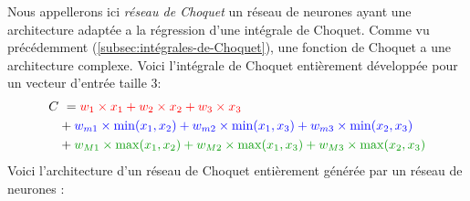 Nous appellerons ici \emph{réseau de Choquet} un réseau de neurones ayant une architecture
adaptée a la régression d'une intégrale de Choquet.
Comme vu précédemment (\ref{subsec:intégrales-de-Choquet}),
une fonction de Choquet a une architecture complexe.
Voici l'intégrale de Choquet entièrement développée pour un vecteur d'entrée taille $3$:
\begin{align*}
    C&\ =
    \color{red}
    w_1 \times x_1 + w_2 \times x_2 + w_3 \times x_3 \\
    \color{black}
    & +
    \color{blue}
    w_{m1} \times \min(x_1, x_2) + w_{m2} \times \min(x_1, x_3) + w_{m3} \times \min(x_2, x_3) \\
    \color{black}
    & +
    \color{mygreen}
    w_{M1} \times \max(x_1, x_2) + w_{M2} \times \max(x_1, x_3) + w_{M3} \times \max(x_2, x_3)
\end{align*}
Voici l'architecture d'un réseau de Choquet entièrement générée par un réseau de neurones :

